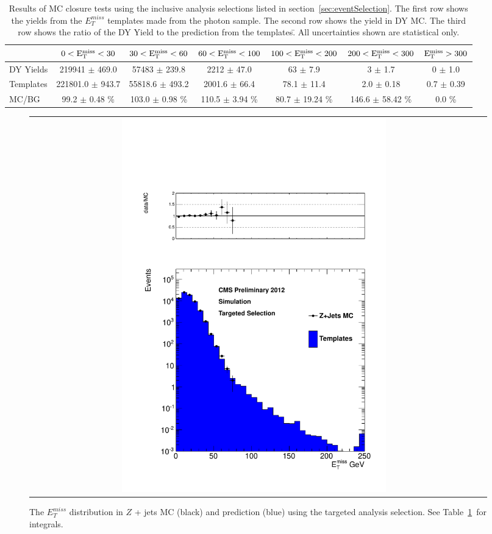 \begin{table}[htb]
\scriptsize
\begin{center}
\caption{\label{table:inclusive} Results of MC closure tests using the inclusive analysis selections listed in section~\ref{sec:eventSelection}. The first row shows the yields from the $E^{miss}_T$ templates made from the photon sample. The second row shows the yield in DY MC. The third row shows the ratio of the DY Yield to the prediction from the templates.̄ All uncertainties shown are statistical only. }
\begin{tabular}{l|c|c|c|c|c|c}
\hline
\hline
          & $0 < \rm{E_{T}^{miss}} < 30$  & $30 < \rm{E_{T}^{miss}} < 60$  & $60 < \rm{E_{T}^{miss}} < 100$  & $100 < \rm{E_{T}^{miss}} < 200$  & $200 < \rm{E_{T}^{miss}} < 300$  &    $\rm{E_{T}^{miss}} > 300$  \\ 
\hline
DY Yields & 219941 $\pm$ 469.0 & 57483 $\pm$ 239.8 &  2212 $\pm$ 47.0 &     63 $\pm$ 7.9 &      3 $\pm$ 1.7 &      0 $\pm$ 1.0 \\
Templates & 221801.0 $\pm$ 943.7 & 55818.6 $\pm$ 493.2 & 2001.6 $\pm$ 66.4 & 78.1 $\pm$ 11.4 &   2.0 $\pm$ 0.18 &   0.7 $\pm$ 0.39 \\
    MC/BG & 99.2 $\pm$ 0.48 \% & 103.0 $\pm$ 0.98 \% & 110.5 $\pm$ 3.94 \% & 80.7 $\pm$ 19.24 \% & 146.6 $\pm$ 58.42 \% & 0.0 \% \\
\hline
\hline
\end{tabular}
\end{center}
\end{table}

\begin{figure}[!h]
\begin{center}
\begin{tabular}{cc}
\includegraphics[width=0.6\textwidth]{plots/closure_targeted.pdf}
\end{tabular}
\caption{The $E^{miss}_T$ distribution in $Z$ + jets MC (black) and prediction (blue) using the targeted analysis selection. See Table~\ref{table:inclusive}~for integrals.
\label{fig:targetedclosure}
}
\end{center}
\end{figure}

